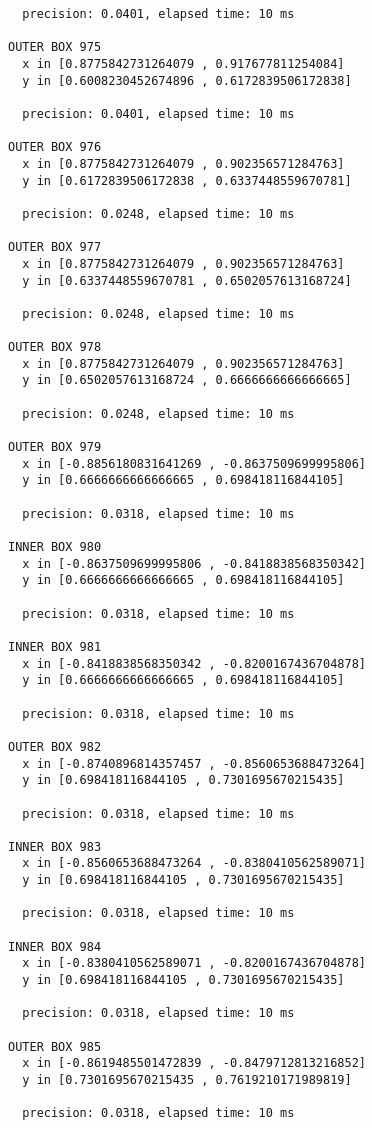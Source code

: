 \begin{verbatim}
  precision: 0.0401, elapsed time: 10 ms

OUTER BOX 975
  x in [0.8775842731264079 , 0.917677811254084]
  y in [0.6008230452674896 , 0.6172839506172838]

  precision: 0.0401, elapsed time: 10 ms

OUTER BOX 976
  x in [0.8775842731264079 , 0.902356571284763]
  y in [0.6172839506172838 , 0.6337448559670781]

  precision: 0.0248, elapsed time: 10 ms

OUTER BOX 977
  x in [0.8775842731264079 , 0.902356571284763]
  y in [0.6337448559670781 , 0.6502057613168724]

  precision: 0.0248, elapsed time: 10 ms

OUTER BOX 978
  x in [0.8775842731264079 , 0.902356571284763]
  y in [0.6502057613168724 , 0.6666666666666665]

  precision: 0.0248, elapsed time: 10 ms

OUTER BOX 979
  x in [-0.8856180831641269 , -0.8637509699995806]
  y in [0.6666666666666665 , 0.698418116844105]

  precision: 0.0318, elapsed time: 10 ms

INNER BOX 980
  x in [-0.8637509699995806 , -0.8418838568350342]
  y in [0.6666666666666665 , 0.698418116844105]

  precision: 0.0318, elapsed time: 10 ms

INNER BOX 981
  x in [-0.8418838568350342 , -0.8200167436704878]
  y in [0.6666666666666665 , 0.698418116844105]

  precision: 0.0318, elapsed time: 10 ms

OUTER BOX 982
  x in [-0.8740896814357457 , -0.8560653688473264]
  y in [0.698418116844105 , 0.7301695670215435]

  precision: 0.0318, elapsed time: 10 ms

INNER BOX 983
  x in [-0.8560653688473264 , -0.8380410562589071]
  y in [0.698418116844105 , 0.7301695670215435]

  precision: 0.0318, elapsed time: 10 ms

INNER BOX 984
  x in [-0.8380410562589071 , -0.8200167436704878]
  y in [0.698418116844105 , 0.7301695670215435]

  precision: 0.0318, elapsed time: 10 ms

OUTER BOX 985
  x in [-0.8619485501472839 , -0.8479712813216852]
  y in [0.7301695670215435 , 0.7619210171989819]

  precision: 0.0318, elapsed time: 10 ms


\end{verbatim}
